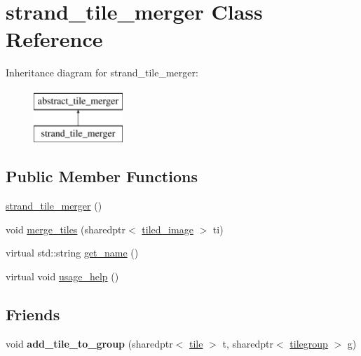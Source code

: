 \hypertarget{classstrand__tile__merger}{\section{strand\-\_\-tile\-\_\-merger Class Reference}
\label{classstrand__tile__merger}
}
Inheritance diagram for strand\-\_\-tile\-\_\-merger\-:\begin{figure}[H]
\begin{center}
\leavevmode
\includegraphics[height=2.000000cm]{classstrand__tile__merger}
\end{center}
\end{figure}
\subsection*{Public Member Functions}
\begin{DoxyCompactItemize}
\item 
\hyperlink{classstrand__tile__merger_a8b5a748fc55b82bac06e27a43d591b8b}{strand\-\_\-tile\-\_\-merger} ()
\item 
void \hyperlink{classstrand__tile__merger_a9ac4662e82da56e988f060b1e138ac05}{merge\-\_\-tiles} (sharedptr$<$ \hyperlink{classtiled__image}{tiled\-\_\-image} $>$ ti)
\item 
virtual std\-::string \hyperlink{classstrand__tile__merger_a3e548d789df5b5a39435c095dd51365b}{get\-\_\-name} ()
\item 
virtual void \hyperlink{classstrand__tile__merger_af623214f3fe92b402d1a5510f1208071}{usage\-\_\-help} ()
\end{DoxyCompactItemize}
\subsection*{Friends}
\begin{DoxyCompactItemize}
\item 
\hypertarget{classstrand__tile__merger_ab8c6db72089df38a920d3b134cce2e76}{void {\bfseries add\-\_\-tile\-\_\-to\-\_\-group} (sharedptr$<$ \hyperlink{classtile}{tile} $>$ t, sharedptr$<$ \hyperlink{classtilegroup}{tilegroup} $>$ g)}\label{classstrand__tile__merger_ab8c6db72089df38a920d3b134cce2e76}

\end{DoxyCompactItemize}


